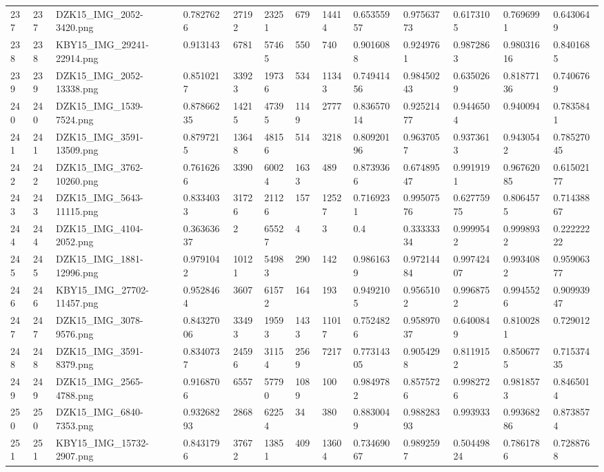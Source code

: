 \documentclass[11pt, a4paper, twoside]{report}
\begin{document}
\begin{longtable}[c]{@{}lllllllllllll@{}}
237 & 237 & DZK15\_IMG\_2052-3420.png & 0.7827626 & 27192 & 23251 & 679 & 14414 & 0.65355957 & 0.97563773 & 0.6173105 & 0.7696991 & 0.6430649 \\
238 & 238 & KBY15\_IMG\_29241-22914.png & 0.913143 & 6781 & 57465 & 550 & 740 & 0.9016088 & 0.9249761 & 0.9872863 & 0.98031616 & 0.8401685 \\
239 & 239 & DZK15\_IMG\_2052-13338.png & 0.8510217 & 33923 & 19736 & 534 & 11343 & 0.74941456 & 0.98450243 & 0.6350269 & 0.81877136 & 0.7406769 \\
240 & 240 & DZK15\_IMG\_1539-7524.png & 0.87866235 & 14215 & 47395 & 1149 & 2777 & 0.83657014 & 0.92521477 & 0.9446504 & 0.940094 & 0.7835841 \\
241 & 241 & DZK15\_IMG\_3591-13509.png & 0.8797215 & 13648 & 48156 & 514 & 3218 & 0.80920196 & 0.9637057 & 0.9373613 & 0.9430542 & 0.78527045 \\
242 & 242 & DZK15\_IMG\_3762-10260.png & 0.7616266 & 3390 & 60024 & 1633 & 489 & 0.8739366 & 0.67489547 & 0.9919191 & 0.96762085 & 0.61502177 \\
243 & 243 & DZK15\_IMG\_5643-11115.png & 0.8334033 & 31726 & 21126 & 157 & 12527 & 0.7169231 & 0.99507576 & 0.62775975 & 0.8064575 & 0.71438867 \\
244 & 244 & DZK15\_IMG\_4104-2052.png & 0.36363637 & 2 & 65527 & 4 & 3 & 0.4 & 0.33333334 & 0.9999542 & 0.9998932 & 0.22222222 \\
245 & 245 & DZK15\_IMG\_1881-12996.png & 0.9791042 & 10121 & 54983 & 290 & 142 & 0.9861639 & 0.97214484 & 0.99742407 & 0.9934082 & 0.95906377 \\
246 & 246 & KBY15\_IMG\_27702-11457.png & 0.9528464 & 3607 & 61572 & 164 & 193 & 0.9492105 & 0.9565102 & 0.9968752 & 0.9945526 & 0.90993947 \\
247 & 247 & DZK15\_IMG\_3078-9576.png & 0.84327006 & 33493 & 19593 & 1433 & 11017 & 0.7524826 & 0.95897037 & 0.6400849 & 0.8100281 & 0.729012 \\
248 & 248 & DZK15\_IMG\_3591-8379.png & 0.8340737 & 24596 & 31154 & 2569 & 7217 & 0.77314305 & 0.9054298 & 0.8119152 & 0.8506775 & 0.71537435 \\
249 & 249 & DZK15\_IMG\_2565-4788.png & 0.9168706 & 6557 & 57790 & 1089 & 100 & 0.9849782 & 0.8575726 & 0.9982726 & 0.9818573 & 0.8465014 \\
250 & 250 & DZK15\_IMG\_6840-7353.png & 0.93268293 & 2868 & 62254 & 34 & 380 & 0.8830049 & 0.98828393 & 0.993933 & 0.99368286 & 0.8738574 \\
251 & 251 & KBY15\_IMG\_15732-2907.png & 0.8431796 & 37672 & 13851 & 409 & 13604 & 0.73469067 & 0.9892597 & 0.50449824 & 0.7861786 & 0.7288768 \\

\end{longtable}
\end{document}
